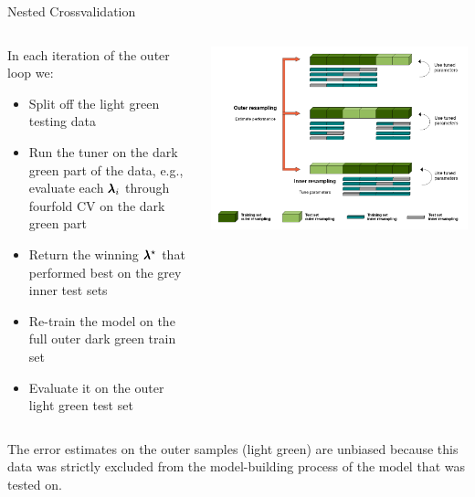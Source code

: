 \begin{frame}{Nested Crossvalidation}
\framebreak

\vspace{1cm}
\begin{columns}[c, onlytextwidth]
\hspace*{-0.3cm}
\begin{footnotesize}
In each iteration of the outer loop we:
\begin{itemize}
\item Split off the light green testing data
\item Run the tuner on the dark green part of the data, e.g.,
  evaluate each $\pmb{\lambda}_i$ through fourfold CV on the dark green part
\item Return the winning $\pmb{\lambda}^\star$ that performed best on the grey inner test sets
\item Re-train the model on the full outer dark green train set
\item Evaluate it on the outer light green test set
\end{itemize}
\end{footnotesize}

\vspace*{-0.3cm}
\begin{center}\includegraphics[width = \textwidth]{images/Nested_Resampling.png}\end{center}
\end{columns}

\begin{footnotesize}
The error estimates on the outer samples (light green) are unbiased because this data was strictly excluded from the model-building process of the model that was tested on.
\end{footnotesize}

\end{frame}

